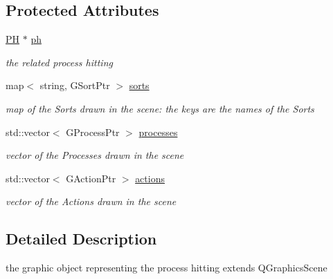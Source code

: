 \subsection*{\-Protected \-Attributes}
\begin{DoxyCompactItemize}
\item 
\hypertarget{class_p_h_scene_a332655cec4c6cca3153ffc3ee14eb465}{\hyperlink{class_p_h}{\-P\-H} $\ast$ \hyperlink{class_p_h_scene_a332655cec4c6cca3153ffc3ee14eb465}{ph}}\label{class_p_h_scene_a332655cec4c6cca3153ffc3ee14eb465}

\begin{DoxyCompactList}\small\item\em the related process hitting \end{DoxyCompactList}\item 
\hypertarget{class_p_h_scene_a664d48bb0ae4f95df04e7a939855cae5}{map$<$ string, \-G\-Sort\-Ptr $>$ \hyperlink{class_p_h_scene_a664d48bb0ae4f95df04e7a939855cae5}{sorts}}\label{class_p_h_scene_a664d48bb0ae4f95df04e7a939855cae5}

\begin{DoxyCompactList}\small\item\em map of the \-Sorts drawn in the scene\-: the keys are the names of the \-Sorts \end{DoxyCompactList}\item 
\hypertarget{class_p_h_scene_a392d190fc16531af5049727766582bed}{std\-::vector$<$ \-G\-Process\-Ptr $>$ \hyperlink{class_p_h_scene_a392d190fc16531af5049727766582bed}{processes}}\label{class_p_h_scene_a392d190fc16531af5049727766582bed}

\begin{DoxyCompactList}\small\item\em vector of the \-Processes drawn in the scene \end{DoxyCompactList}\item 
\hypertarget{class_p_h_scene_a5802a1a674ffd883d3bf8403399365fb}{std\-::vector$<$ \-G\-Action\-Ptr $>$ \hyperlink{class_p_h_scene_a5802a1a674ffd883d3bf8403399365fb}{actions}}\label{class_p_h_scene_a5802a1a674ffd883d3bf8403399365fb}

\begin{DoxyCompactList}\small\item\em vector of the \-Actions drawn in the scene \end{DoxyCompactList}\end{DoxyCompactItemize}


\subsection{\-Detailed \-Description}
the graphic object representing the process hitting extends \-Q\-Graphics\-Scene 

